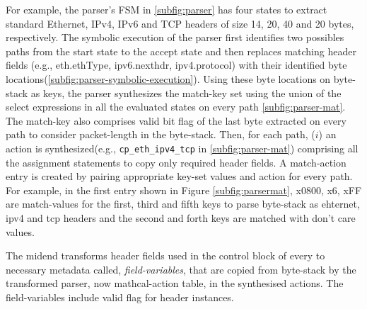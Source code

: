 \documentclass[letterpaper,twocolumn,10pt]{article}
\begin{document}
For example, the parser's FSM in \cref{subfig:parser} has four 
states to extract standard Ethernet, IPv4, IPv6 and TCP headers of 
size 14, 20, 40 and 20 bytes, respectively. The symbolic execution of 
the parser first identifies two possibles paths from the start state 
to the accept state and then replaces matching header fields (e.g., 
eth.ethType, ipv6.nexthdr, ipv4.protocol) with their identified byte 
locations(\cref{subfig:parser-symbolic-execution}).
Using these byte locations on byte-stack as keys, the parser 
synthesizes the match-key set using the union of the select 
expressions in all the evaluated states on every path 
\cref{subfig:parser-mat}. The match-key also comprises valid bit flag 
of the last byte extracted on every path to consider packet-length in 
the byte-stack. Then, for each path, ($i$) an action is 
synthesized(e.g., \texttt{cp\_eth\_ipv4\_tcp} in 
\cref{subfig:parser-mat}) comprising all the assignment statements 
to copy only required header fields. A match-action 
entry is created by pairing appropriate key-set values and action for 
every path.
For example, in the first entry shown in Figure 
\ref{subfig:parsermat}, x0800, x6, xFF are match-values for the first, 
third and fifth keys to parse byte-stack as ehternet, ipv4 and tcp 
headers and the second and forth keys are matched with don't care 
values.

The midend transforms header fields used in the control block 
of every \uprogram to necessary metadata called, 
\emph{field-variables}, that are copied from byte-stack by the 
transformed parser, now mathcal-action table, in the synthesised 
actions. The field-variables include valid flag for header instances.
\end{document}
